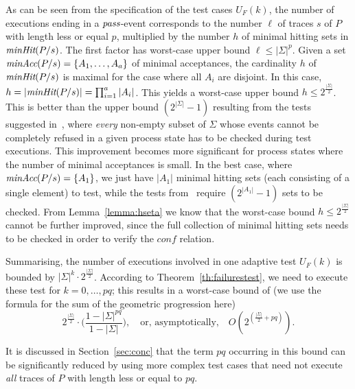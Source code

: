 As can be seen from the specification of the test cases $U_F(k)$, the number of 
executions ending in a ${\text{\it pass}}$-event corresponds to the number $\ell$ of traces $s$ 
of $P$ with length less or equal $p$, multiplied by the number $h$ of minimal hitting sets in
$\text{\it minHit}(P/s)$. The first factor 
has worst-case upper bound $\ell\le |\Sigma|^p$.
Given a set $\text{\it minAcc}(P/s) = \{ A_1,\dots, A_a \}$ of   minimal acceptances,
the cardinality $h$ of $\text{\it minHit}(P/s)$ is maximal for the case where all $A_i$ are disjoint.
In this case,  $h=|\text{\it minHit}(P/s)| = \prod_{i=1}^a|A_i|$. This yields a worst-case upper bound $h\le 2^{\frac{|\Sigma|}{2}}$. This is better than the upper bound $(2^{|\Sigma|}-1)$
resulting from the tests suggested in~\cite{Hennessy:1988:ATP:50497}, where {\it every}
non-empty 
subset of $\Sigma$ whose events cannot be completely refused in a given process state
has to be checked during test executions. This improvement becomes more significant for process states where the number of minimal acceptances is small. In the best case, where
 $\text{\it minAcc}(P/s) = \{ A_1  \}$, we just have $|A_1|$ minimal hitting sets (each consisting of a single element) to test, while the tests from~\cite{Hennessy:1988:ATP:50497} 
 require $(2^{|A_1|}-1)$ sets to be checked. From Lemma~\ref{lemma:hseta} we know that 
 the worst-case bound $h\le 2^{\frac{|\Sigma|}{2}}$ cannot be further improved, since 
the full collection of minimal hitting sets needs to be checked in order to verify
the $conf$ relation.

Summarising, the number of executions involved in one adaptive test $U_F(k)$ is bounded
by $|\Sigma|^k\cdot 2^{\frac{|\Sigma|}{2}}$. According to Theorem~\ref{th:failurestest},
we need to execute these test for $k = 0,\dots,pq$; this results in a worst-case bound
of (we use the formula for the sum of the geometric progression here)
\[
    2^{\frac{|\Sigma|}{2}}\cdot\big( \frac{1-|\Sigma|^{pq}}{1-|\Sigma|} \big),
    \quad\text{or, asymptotically,}\quad O(2^{(\frac{|\Sigma|}{2} + pq)}).
\]

It is discussed in Section~\ref{sec:conc} that the term $pq$ occurring in this bound can be significantly reduced by using more complex test cases that need not execute {\it all} 
traces of $P$ with length less or equal to $pq$.













